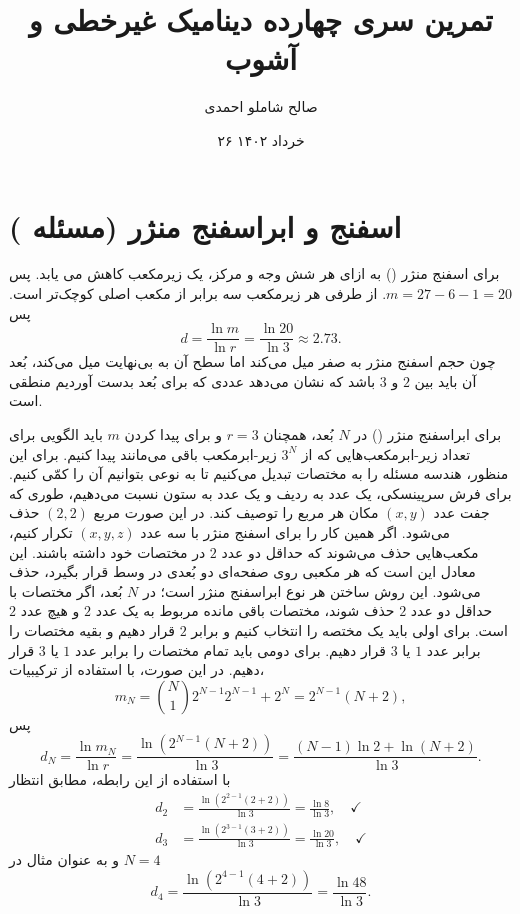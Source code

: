 \documentclass[12pt,a4paper]{article}
\title{تمرین سری چهارده دینامیک غیرخطی و آشوب}
\author{صالح شاملو احمدی}
\date{۲۶ خرداد ۱۴۰۲}
\begin{document}
	\twocolumnfootnotes
	\maketitle
	\section{اسفنج و ابراسفنج منژر (مسئله )}
	برای اسفنج منژر () به ازای هر شش وجه و مرکز، یک زیرمکعب کاهش می یابد. پس
	$m = 27 - 6 - 1 = 20$.
	از طرفی هر زیرمکعب سه برابر از مکعب اصلی کوچک‌تر است. پس
	\begin{equation}
		d = \frac{\ln m}{\ln r} = \frac{\ln 20}{\ln 3} \approx 2.73.
	\end{equation}
	چون حجم اسفنج منژر به صفر میل می‌کند اما سطح آن به بی‌نهایت میل می‌کند، بُعد آن باید بین $2$ و $3$ باشد
	که نشان می‌دهد عددی که برای بُعد بدست آوردیم منطقی است.
	
	برای ابراسفنج منژر () در $N$ بُعد، همچنان $r=3 $ و برای پیدا کردن $m$ باید الگویی
	برای تعداد زیر-ابرمکعب‌هایی که از $3^N$ زیر-ابرمکعب باقی می‌مانند پیدا کنیم. برای این منظور، هندسه مسئله را
	به مختصات تبدیل می‌کنیم تا به نوعی بتوانیم آن را کمّی کنیم. برای فرش سرپینسکی، یک عدد به ردیف و یک عدد به ستون
	نسبت می‌دهیم، طوری که جفت عدد $(x, y)$ مکان هر مربع را توصیف کند. در این صورت مربع $(2, 2)$ حذف می‌شود. اگر همین
	کار را برای اسفنج منژر با سه عدد $(x, y, z)$ تکرار کنیم، مکعب‌هایی حذف می‌شوند که حداقل دو عدد $2$ در مختصات خود
	داشته باشند. این معادل این است که هر مکعبی روی صفحه‌ای دو بُعدی در وسط قرار بگیرد، حذف می‌شود. این روش ساختن
	هر نوع ابراسفنج منژر است؛ در $N$ بُعد، اگر مختصات با حداقل دو عدد $2$ حذف شوند، مختصات باقی مانده مربوط به یک
	عدد $2$ و هیچ عدد $2$ است. برای اولی باید یک مختصه را انتخاب کنیم و برابر $2$ قرار دهیم و بقیه مختصات را برابر
	عدد $1$ یا $3$ قرار دهیم. برای دومی باید تمام مختصات را برابر عدد $1$ یا $3$ قرار دهیم. در این صورت، با استفاده
	از ترکیبیات،
	\begin{equation}
		m_N = \binom{N}{1}2^{N-1}2^{N-1} + 2^N = 2^{N-1}(N + 2),
	\end{equation}
	پس
	\begin{equation}
		d_N = \frac{\ln m_N}{\ln r} = \frac{\ln(2^{N-1}(N + 2))}{\ln 3} = \frac{(N-1)\ln 2 + \ln(N+2)}{\ln 3}.
	\end{equation}
	با استفاده از این رابطه، مطابق انتظار
	\begin{align}
		d_2 &= \frac{\ln(2^{2-1}(2 + 2))}{\ln 3} = \frac{\ln 8}{\ln 3}, \quad\checkmark \\
		d_3 &= \frac{\ln(2^{3-1}(3 + 2))}{\ln 3} = \frac{\ln 20}{\ln 3}, \quad\checkmark
	\end{align}
	و به عنوان مثال در $N=4 $
	\begin{equation}
		d_4 = \frac{\ln(2^{4-1}(4 + 2))}{\ln 3} = \frac{\ln 48}{\ln 3}.
	\end{equation}
	
\end{document}
